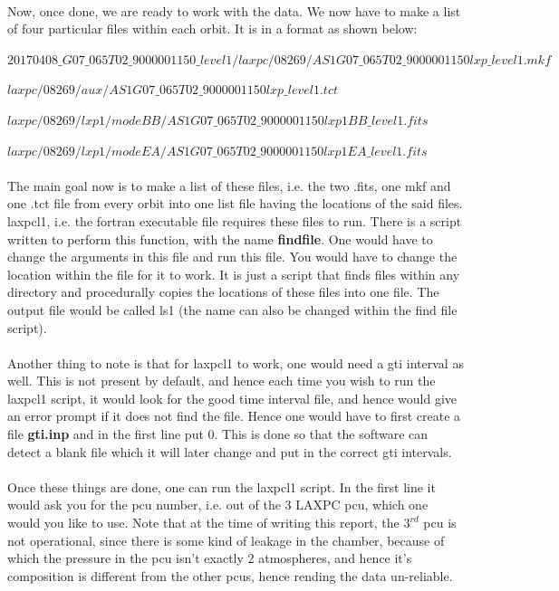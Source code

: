 \documentclass[a4paper,twoside]{report}
\numberwithin{equation}{section}
\begin{document}
\paragraph{}
Now, once done, we are ready to work with the data. We now have to make a list of four particular files within each orbit. It is in a format as shown below:
\begin{center}
\item {$20170408\_G07\_065T02\_9000001150\_level1/laxpc/08269/AS1G07\_065T02\_9000001150lxp\_level1.mkf$}
\item {$laxpc/08269/aux/AS1G07\_065T02\_9000001150lxp\_level1.tct$}
\item {$laxpc/08269/lxp1/modeBB/AS1G07\_065T02\_9000001150lxp1BB\_level1.fits$}
\item {$laxpc/08269/lxp1/modeEA/AS1G07\_065T02\_9000001150lxp1EA\_level1.fits$}
\end{center}
\paragraph{}
The main goal now is to make a list of these files, i.e. the two .fits, one mkf and one .tct file from every orbit into one list file having the locations of the said files. laxpcl1, i.e. the fortran executable file requires these files to run. There is a script written to perform this function, with the name \textbf{findfile}. One would have to change the arguments in this file and run this file. You would have to change the location within the file for it to work. It is just a script that finds files within any directory and procedurally copies the locations of these files into one file. The output file would be called ls1 (the name can also be changed within the find file script). 
\paragraph{}
Another thing to note is that for laxpcl1 to work, one would need a gti interval as well. This is not present by default, and hence each time you wish to run the laxpcl1 script, it would look for the good time interval file, and hence would give an error prompt if it does not find the file. Hence one would have to first create a file \textbf{gti.inp} and in the first line put 0. This is done so that the software can detect a blank file which it will later change and put in the correct gti intervals. 
\paragraph{}
Once these things are done, one can run the laxpcl1 script. In the first line it would ask you for the pcu number, i.e. out of the 3 LAXPC pcu, which one would you like to use. Note that at the time of writing this report, the $3^{rd}$ pcu is not operational, since there is some kind of leakage in the chamber, because of which the pressure in the pcu isn't exactly 2 atmospheres, and hence it's composition is different from the other pcus, hence rending the data un-reliable. 
\end{document}
